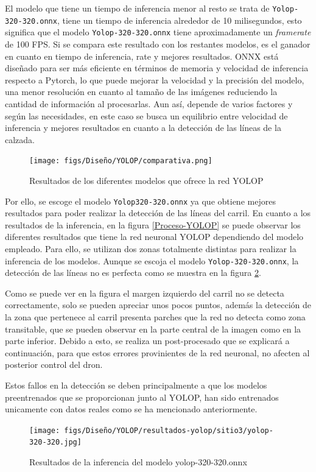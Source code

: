 El modelo que tiene un tiempo de inferencia menor al resto se trata de \texttt{Yolop-320-320.onnx}, tiene un tiempo de inferencia alrededor de 10 milisegundos, esto
significa que el modelo \texttt{Yolop-320-320.onnx} tiene aproximadamente un \textit{framerate} de 100 FPS. Si se compara este resultado con los restantes modelos, es el ganador en cuanto 
en tiempo de inferencia, rate y mejores resultados. 
ONNX está diseñado para ser más eficiente en términos de memoria y velocidad de inferencia respecto a Pytorch, lo que puede mejorar la velocidad y la precisión
del modelo, una menor resolución en cuanto al tamaño de las imágenes reduciendo la cantidad de información al procesarlas. Aun así, depende de varios factores y según las necesidades, 
en este caso se busca un equilibrio entre velocidad de inferencia y mejores resultados en cuanto a la detección de las líneas de la calzada. 

\begin{figure} [H]
  \begin{center}
    \texttt{[image: figs/Diseño/YOLOP/comparativa.png]}
  \end{center}
  \caption{Resultados de los diferentes modelos que ofrece la red YOLOP}
  \label{fig:resultados_pesos_preentrenados}
  \vspace{-1.5em}
\end{figure}
Por ello, se escoge el modelo \texttt{Yolop320-320.onnx} ya que obtiene mejores resultados para poder realizar la detección de las líneas del carril. 
En cuanto a los resultados de la inferencia, en la figura \ref{Proceso-YOLOP} 
se puede observar los diferentes resultados que tiene la red neuronal YOLOP dependiendo del modelo empleado. Para ello, se utilizan dos zonas totalmente distintas para realizar 
la inferencia de los modelos. Aunque se escoja el modelo \texttt{Yolop-320-320.onnx}, la detección de las líneas no es perfecta como se muestra en la figura 
\ref{f:Inferencia320-320}. 

Como se puede ver en la figura el margen izquierdo del carril no se detecta correctamente, solo se pueden apreciar unos pocos puntos, además la detección 
de la zona que pertenece al carril presenta parches que la red no detecta como zona transitable, que se pueden observar en la parte central de la imagen como en la parte inferior. Debido 
a esto, se realiza un post-procesado que se explicará a continuación, para que estos errores provinientes de la red neuronal, no afecten al posterior control del dron. 

Estos fallos en la detección se deben principalmente a que los modelos preentrenados que se proporcionan junto al YOLOP, han sido entrenados unicamente con datos reales como se 
ha mencionado anteriormente. 
\begin{figure} [H]
  \begin{center}
    \texttt{[image: figs/Diseño/YOLOP/resultados-yolop/sitio3/yolop-320-320.jpg]}
  \end{center}
  \caption{Resultados de la inferencia del modelo yolop-320-320.onnx}
  \label{f:Inferencia320-320}
  \vspace{-1.5em}
\end{figure}

